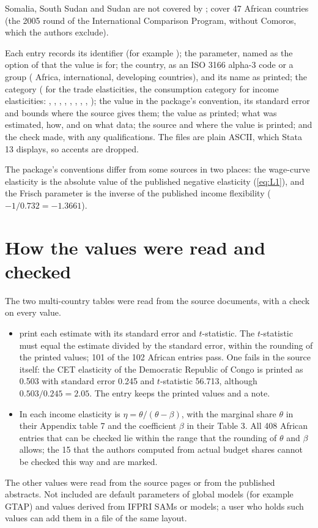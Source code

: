 Somalia, South Sudan and Sudan are not covered by \citet{devarajan2023};
\citet{muhammad2011} cover 47 African countries (the 2005 round of the
International Comparison Program, without Comoros, which the authors exclude).

Each entry records its identifier (for example ); the
parameter, named as the option of  that the value is for;
the country, as an ISO 3166 alpha-3 code or a group ( Africa,
 international,  developing countries), and its name as
printed; the category ( for the trade elasticities, the
consumption category for income elasticities: , ,
, , , ,
, , ); the value in the package's
convention, its standard error and bounds where the source gives them; the
value as printed; what was estimated, how, and on what data; the source and
where the value is printed; and the check made, with any qualifications. The
files are plain ASCII, which Stata 13 displays, so accents are dropped.

The package's conventions differ from some sources in two places: the
wage-curve elasticity is the absolute value of the published negative
elasticity (\eqref{eq:L1}), and the Frisch parameter is the inverse of the
published income flexibility ($-1/0.732 = -1.3661$).

\section{How the values were read and checked}

The two multi-country tables were read from the source documents, with a check
on every value.
\begin{itemize}
\item \citet{devarajan2023} print each estimate with its standard error and
$t$-statistic. The $t$-statistic must equal the estimate divided by the
standard error, within the rounding of the printed values; 101 of the 102
African entries pass. One fails in the source itself: the CET elasticity of
the Democratic Republic of Congo is printed as 0.503 with standard error 0.245
and $t$-statistic 56.713, although $0.503/0.245 = 2.05$. The entry keeps the
printed values and a note.
\item In \citet{muhammad2011} each income elasticity is
$\eta = \theta / (\theta - \beta)$, with the marginal share $\theta$ in their
Appendix table 7 and the coefficient $\beta$ in their Table 3. All 408 African
entries that can be checked lie within the range that the rounding of $\theta$
and $\beta$ allows; the 15 that the authors computed from actual budget shares
cannot be checked this way and are marked.
\end{itemize}
The other values were read from the source pages or from the published
abstracts. Not included are default parameters of global models (for example
GTAP) and values derived from IFPRI SAMs or models; a user who holds such values
can add them in a file of the same layout.

